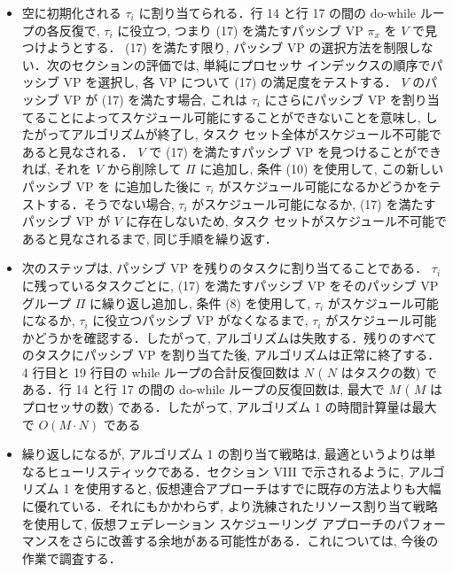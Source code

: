 \begin{frame}{}
    \begin{itemize}
        \item 空に初期化される $\tau_{i}$ に割り当てられる．行 14 と行 17 の間の do-while ループの各反復で, $\tau_{i}$ に役立つ, つまり (17) を満たすパッシブ VP $\pi_{x}$ を $V$ で見つけようとする． (17) を満たす限り, パッシブ VP の選択方法を制限しない．次のセクションの評価では, 単純にプロセッサ インデックスの順序でパッシブ VP を選択し, 各 VP について (17) の満足度をテストする． $V$ のパッシブ VP が (17) を満たす場合, これは $\tau_{i}$ にさらにパッシブ VP を割り当てることによってスケジュール可能にすることができないことを意味し, したがってアルゴリズムが終了し, タスク セット全体がスケジュール不可能であると見なされる． $V$ で (17) を満たすパッシブ VP を見つけることができれば, それを $V$ から削除して $\Pi$ に追加し, 条件 (10) を使用して, この新しいパッシブ VP を に追加した後に $\tau_{i}$ がスケジュール可能になるかどうかをテストする．そうでない場合, $\tau_{i}$ がスケジュール可能になるか, (17) を満たすパッシブ VP が $V$ に存在しないため, タスク セットがスケジュール不可能であると見なされるまで, 同じ手順を繰り返す．
    \end{itemize}
\end{frame}

\begin{frame}{}
    \begin{itemize}
        \item 次のステップは, パッシブ VP を残りのタスクに割り当てることである． $\tau_{i}$ に残っているタスクごとに, (17) を満たすパッシブ VP をそのパッシブ VP グループ $\Pi$ に繰り返し追加し, 条件 (8) を使用して, $\tau_{i}$ がスケジュール可能になるか, $\tau_{i}$ に役立つパッシブ VP がなくなるまで, $\tau_{i}$ がスケジュール可能かどうかを確認する．したがって, アルゴリズムは失敗する．残りのすべてのタスクにパッシブ VP を割り当てた後, アルゴリズムは正常に終了する． 4 行目と 19 行目の while ループの合計反復回数は $N$ ( $N$ はタスクの数) である．行 14 と行 17 の間の do-while ループの反復回数は, 最大で $M$ ( $M$ はプロセッサの数) である．したがって, アルゴリズム 1 の時間計算量は最大で $O(M \cdot N)$ である
    \end{itemize}
\end{frame}

\begin{frame}{}
    \begin{itemize}
        \item 繰り返しになるが, アルゴリズム 1 の割り当て戦略は, 最適というよりは単なるヒューリスティックである．セクション VIII で示されるように, アルゴリズム 1 を使用すると, 仮想連合アプローチはすでに既存の方法よりも大幅に優れている．それにもかかわらず, より洗練されたリソース割り当て戦略を使用して, 仮想フェデレーション スケジューリング アプローチのパフォーマンスをさらに改善する余地がある可能性がある．これについては, 今後の作業で調査する．
    \end{itemize}
\end{frame}
